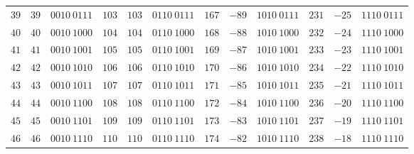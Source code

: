 \begin{center}
\begin{minipage}{0.5\linewidth}
\begin{center}
\begin{tabular}{|c|c|c||c|c|c||c|c|c||c|c|c|}
            \textcolor{numColor}{$39$} & \textcolor{twoColor}{$39$} & $0010~0111$ & \textcolor{numColor}{$103$} & \textcolor{twoColor}{$103$} & $0110~0111$ & \textcolor{numColor}{$167$} & \textcolor{twoColor}{$-89$} & $1010~0111$ & \textcolor{numColor}{$231$} & \textcolor{twoColor}{$-25$} & $1110~0111$\\ 
            \textcolor{numColor}{$40$} & \textcolor{twoColor}{$40$} & $0010~1000$ & \textcolor{numColor}{$104$} & \textcolor{twoColor}{$104$} & $0110~1000$ & \textcolor{numColor}{$168$} & \textcolor{twoColor}{$-88$} & $1010~1000$ & \textcolor{numColor}{$232$} & \textcolor{twoColor}{$-24$} & $1110~1000$\\ 
            \textcolor{numColor}{$41$} & \textcolor{twoColor}{$41$} & $0010~1001$ & \textcolor{numColor}{$105$} & \textcolor{twoColor}{$105$} & $0110~1001$ & \textcolor{numColor}{$169$} & \textcolor{twoColor}{$-87$} & $1010~1001$ & \textcolor{numColor}{$233$} & \textcolor{twoColor}{$-23$} & $1110~1001$\\ 
            \textcolor{numColor}{$42$} & \textcolor{twoColor}{$42$} & $0010~1010$ & \textcolor{numColor}{$106$} & \textcolor{twoColor}{$106$} & $0110~1010$ & \textcolor{numColor}{$170$} & \textcolor{twoColor}{$-86$} & $1010~1010$ & \textcolor{numColor}{$234$} & \textcolor{twoColor}{$-22$} & $1110~1010$\\ 
            \textcolor{numColor}{$43$} & \textcolor{twoColor}{$43$} & $0010~1011$ & \textcolor{numColor}{$107$} & \textcolor{twoColor}{$107$} & $0110~1011$ & \textcolor{numColor}{$171$} & \textcolor{twoColor}{$-85$} & $1010~1011$ & \textcolor{numColor}{$235$} & \textcolor{twoColor}{$-21$} & $1110~1011$\\ 
            \textcolor{numColor}{$44$} & \textcolor{twoColor}{$44$} & $0010~1100$ & \textcolor{numColor}{$108$} & \textcolor{twoColor}{$108$} & $0110~1100$ & \textcolor{numColor}{$172$} & \textcolor{twoColor}{$-84$} & $1010~1100$ & \textcolor{numColor}{$236$} & \textcolor{twoColor}{$-20$} & $1110~1100$\\ 
            \textcolor{numColor}{$45$} & \textcolor{twoColor}{$45$} & $0010~1101$ & \textcolor{numColor}{$109$} & \textcolor{twoColor}{$109$} & $0110~1101$ & \textcolor{numColor}{$173$} & \textcolor{twoColor}{$-83$} & $1010~1101$ & \textcolor{numColor}{$237$} & \textcolor{twoColor}{$-19$} & $1110~1101$\\ 
            \textcolor{numColor}{$46$} & \textcolor{twoColor}{$46$} & $0010~1110$ & \textcolor{numColor}{$110$} & \textcolor{twoColor}{$110$} & $0110~1110$ & \textcolor{numColor}{$174$} & \textcolor{twoColor}{$-82$} & $1010~1110$ & \textcolor{numColor}{$238$} & \textcolor{twoColor}{$-18$} & $1110~1110$\\ 

\end{tabular}
\end{center}
\end{minipage}
\end{center}

